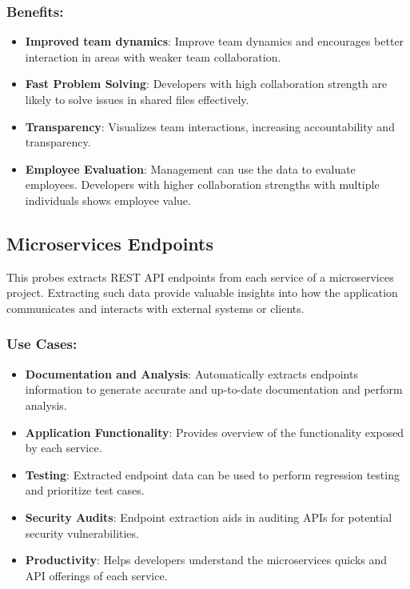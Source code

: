 \subsubsection{Benefits:}
\begin{itemize}[label=$\bullet$]
	\item \textbf{Improved team dynamics}: Improve team dynamics and encourages better interaction in areas with weaker team collaboration.
	\item \textbf{Fast Problem Solving}: Developers with high collaboration strength are likely to solve issues in shared files effectively.
	\item \textbf{Transparency}: Visualizes team interactions, increasing accountability and transparency.
	\item \textbf{Employee Evaluation}: Management can use the data to evaluate employees. Developers with higher collaboration strengths with multiple individuals shows employee value.
\end{itemize} 

\subsection{Microservices Endpoints}
This probes extracts REST API endpoints from each service of a microservices project. Extracting such data provide valuable insights into how the application communicates and interacts with external systems or clients.
\subsubsection{Use Cases:}
\begin{itemize}[label=$\bullet$]
	\item \textbf{Documentation and Analysis}: Automatically extracts endpoints information to generate accurate and up-to-date documentation and perform analysis.
	\item \textbf{Application Functionality}: Provides overview of the functionality exposed by each service.
	\item \textbf{Testing}: Extracted endpoint data can be used to perform regression testing and prioritize test cases.
	\item \textbf{Security Audits}: Endpoint extraction aids in auditing APIs for potential security vulnerabilities.
	\item \textbf{Productivity}: Helps developers understand the microservices quicks and API offerings of each service.
\end{itemize}
